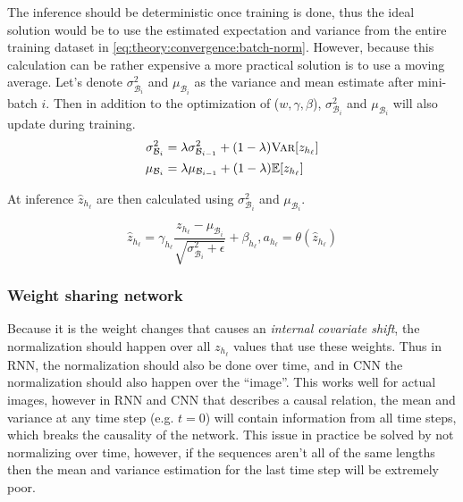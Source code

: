 The inference should be deterministic once training is done, thus the ideal solution would be to use the estimated expectation and variance from the entire training dataset in \eqref{eq:theory:convergence:batch-norm}. However, because this calculation can be rather expensive a more practical solution is to use a moving average. Let's denote $\sigma^2_{\mathcal{B}_i}$ and $\mu_{\mathcal{B}_i}$ as the variance and mean estimate after mini-batch $i$. Then in addition to the optimization of ($w, \gamma, \beta$), $\sigma^2_{\mathcal{B}_i}$ and $\mu_{\mathcal{B}_i}$ will also update during training.
\begin{equation}
\begin{aligned}
\sigma^2_{\mathcal{B}_i} &= \lambda \sigma^2_{\mathcal{B}_{i-1}} + (1 - \lambda) \textsc{Var}[z_{h_\ell}] \\
\mu_{\mathcal{B}_i} &= \lambda \mu_{\mathcal{B}_{i-1}} + (1 - \lambda) \mathbb{E}[z_{h_\ell}]
\end{aligned}
\end{equation}

At inference $\hat{z}_{h_\ell}$ are then calculated using $\sigma^2_{\mathcal{B}_i}$ and $\mu_{\mathcal{B}_i}$.

\begin{equation}
\hat{z}_{h_\ell} = \gamma_{h_\ell} \frac{z_{h_\ell} - \mu_{\mathcal{B}_i}}{\sqrt{\sigma^2_{\mathcal{B}_i} + \epsilon}} + \beta_{h_\ell}, a_{h_\ell} = \theta(\hat{z}_{h_\ell})
\end{equation}

\subsubsection{Weight sharing network}

Because it is the weight changes that causes an \textit{internal covariate shift}, the normalization should happen over all $z_{h_\ell}$ values that use these weights. Thus in RNN, the normalization should also be done over time, and in CNN the normalization should also happen over the ``image''. This works well for actual images, however in RNN and CNN that describes a causal relation, the mean and variance at any time step (e.g. $t=0$) will contain information from all time steps, which breaks the causality of the network. This issue in practice be solved by not normalizing over time, however, if the sequences aren't all of the same lengths then the mean and variance estimation for the last time step will be extremely poor.

